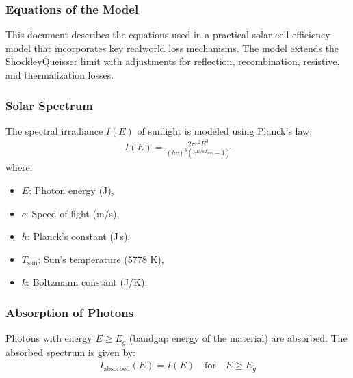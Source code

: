 \documentclass[letterpaper,10pt,english]{jupyterBook}
\begin{document}
\subsubsection{Equations of the Model}
\label{\detokenize{ProjectInstructions:equations-of-the-model}}
\sphinxAtStartPar
This document describes the equations used in a practical solar cell
efficiency model that incorporates key real\sphinxhyphen{}world loss mechanisms. The
model extends the Shockley\sphinxhyphen{}Queisser limit with adjustments for
reflection, recombination, resistive, and thermalization losses.


\subsubsection{Solar Spectrum}
\label{\detokenize{ProjectInstructions:solar-spectrum}}
\sphinxAtStartPar
The spectral irradiance \(I(E)\) of sunlight is modeled using Planck’s
law:
\begin{equation*}
\begin{split}I(E) = \frac{2 \pi c^2 E^3}{(hc)^3 \left(e^{E / kT_{\text{sun}}} - 1\right)}\end{split}
\end{equation*}
\sphinxAtStartPar
where:
\begin{itemize}
\item {} 
\sphinxAtStartPar
\(E\): Photon energy (J),

\item {} 
\sphinxAtStartPar
\(c\): Speed of light (m/s),

\item {} 
\sphinxAtStartPar
\(h\): Planck’s constant (J s),

\item {} 
\sphinxAtStartPar
\(T_{\text{sun}}\): Sun’s temperature (5778 K),

\item {} 
\sphinxAtStartPar
\(k\): Boltzmann constant (J/K).

\end{itemize}


\subsubsection{Absorption of Photons}
\label{\detokenize{ProjectInstructions:absorption-of-photons}}
\sphinxAtStartPar
Photons with energy \(E \geq E_g\) (bandgap energy of the material) are
absorbed. The absorbed spectrum is given by:
\begin{equation*}
\begin{split}I_{\text{absorbed}}(E) = I(E) \quad \text{for} \quad E \geq E_g\end{split}
\end{equation*}
\end{document}
